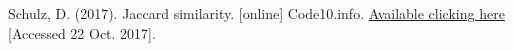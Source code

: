 \documentclass[fleqn,10pt]{SelfArx} %
\begin{document}
\begin{thebibliography}{9}

Schulz, D. (2017). Jaccard similarity. [online] Code10.info. 
\href{http://www.code10.info/index.php?option=com_content&view=article&id=60:articlejaccard-similarity&catid=38:cat_coding_algorithms_data-similarity&Itemid=57}{Available clicking here} [Accessed 22 Oct. 2017].

\end{thebibliography}



\end{document}
